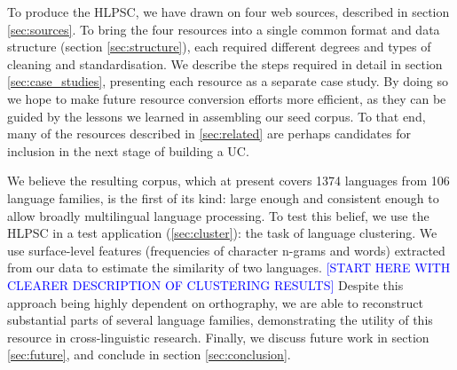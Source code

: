 To produce the HLPSC, we have drawn on four web sources, described in section \ref{sec:sources}. To bring the four resources into a single common format and data structure (section \ref{sec:structure}), each required different degrees and types of cleaning and standardisation. We describe the steps required in detail in section \ref{sec:case_studies}, presenting each resource as a separate case study. By doing so we hope to make future resource conversion efforts more efficient, as they can be guided by the lessons we learned in assembling our seed corpus. To that end, many of the resources described in \ref{sec:related} are perhaps candidates for inclusion in the next stage of building a UC.

We believe the resulting corpus, which at present covers 1374 languages from 106 language families, is the first of its kind: large enough and consistent enough to allow broadly multilingual language processing. To test this belief, we use the HLPSC in a test application (\ref{sec:cluster}): the task of language clustering. We use surface-level features (frequencies of character n-grams and words) extracted from our data to estimate the similarity of two languages.  \textcolor{blue}{[START HERE WITH CLEARER DESCRIPTION OF CLUSTERING RESULTS]}
Despite this approach being highly dependent on orthography, we are able to reconstruct substantial parts of several language families, demonstrating the utility of this resource in cross-linguistic research. Finally, we discuss future work in section \ref{sec:future}, and conclude in section \ref{sec:conclusion}.







